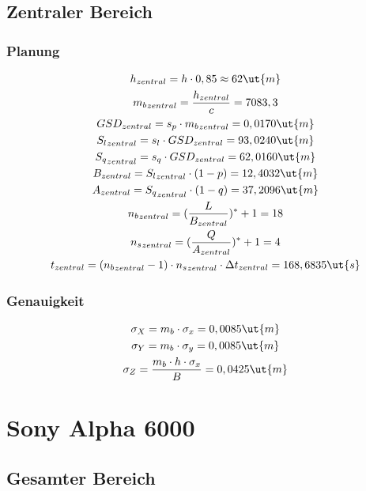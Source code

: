 \subsection{Zentraler Bereich}
\subsubsection{Planung}
\begin{gather*}
	h_{zentral} = h \cdot 0,85 \approx 62 \ut{m} \\
	{m_b}_{zentral}  = \frac{h_{zentral}}{c} = 7083,3 \\
	GSD_{zentral} = s_p \cdot {m_b}_{zentral} = 0,0170 \ut{m} \\
	{S_l}_{zentral} = s_l \cdot GSD_{zentral} = 93,0240 \ut{m} \\
	{S_q}_{zentral} = s_q \cdot GSD_{zentral} = 62,0160 \ut{m} \\
	B_{zentral} = {S_l}_{zentral} \cdot (1-p) = 12,4032 \ut{m} \\
	A_{zentral} = {S_q}_{zentral} \cdot (1-q) = 37,2096 \ut{m} \\
	{n_b}_{zentral} = (\frac{L}{B_{zentral}})^* + 1 = 18 \\
	{n_s}_{zentral} = (\frac{Q}{A_{zentral}})^* + 1 = 4 \\	
	t_{zentral} = ({n_b}_{zentral} - 1) \cdot {n_s}_{zentral} \cdot \Delta t_{zentral} = 168,6835 \ut{s} \\
\end{gather*}
\subsubsection{Genauigkeit}
\begin{gather*}
	\sigma_X = m_b \cdot \sigma_x = 0,0085 \ut{m} \\
	\sigma_Y = m_b \cdot \sigma_y = 0,0085\ut{m} \\
	\sigma_Z = \frac{m_b \cdot h \cdot \sigma_x}{B} = 0,0425 \ut{m}
\end{gather*}
\newpage

\section{Sony Alpha 6000}
\subsection{Gesamter Bereich}
